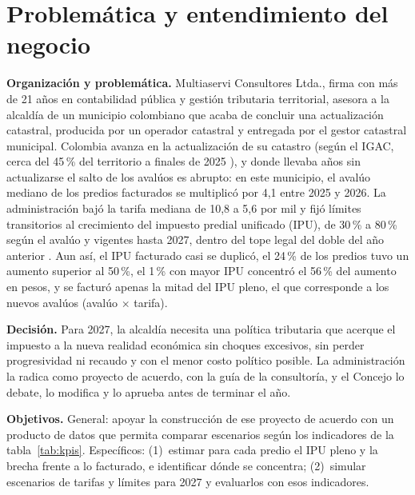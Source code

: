 \documentclass[12pt,letterpaper]{article}
\begin{document}
\encabezado


\section{Problemática y entendimiento del negocio} %
\textbf{Organización y problemática.} Multiaservi Consultores Ltda., firma con más de 21 años
en contabilidad pública y gestión tributaria territorial, asesora a la alcaldía de un municipio
colombiano que acaba de concluir una actualización catastral, producida por un operador catastral
y entregada por el gestor catastral municipal. Colombia avanza en la actualización de su catastro
(según el IGAC, cerca del 45\,\% del territorio a finales de 2025 \cite{portafolio2025igac}), y
donde llevaba años sin actualizarse el salto de los avalúos es abrupto: en este municipio, el
avalúo mediano de los predios facturados se multiplicó por 4,1 entre 2025 y 2026. La
administración bajó la tarifa mediana de 10,8 a 5,6 por mil y fijó límites transitorios al
crecimiento del impuesto predial unificado (IPU), de 30\,\% a 80\,\% según el avalúo y vigentes
hasta 2027, dentro del tope legal del doble del año anterior \cite{ley44}. Aun así, el IPU
facturado casi se duplicó, el 24\,\% de los predios tuvo un aumento superior al 50\,\%, el 1\,\%
con mayor IPU concentró el 56\,\% del aumento en pesos, y se facturó apenas la mitad del IPU
pleno, el que corresponde a los nuevos avalúos (avalúo $\times$ tarifa).

\textbf{Decisión.} Para 2027, la alcaldía necesita una política tributaria que acerque el
impuesto a la nueva realidad económica sin choques excesivos, sin perder progresividad ni recaudo
y con el menor costo político posible. La administración la radica como proyecto de acuerdo, con
la guía de la consultoría, y el Concejo lo debate, lo modifica y lo aprueba antes de terminar el
año.

\textbf{Objetivos.} General: apoyar la construcción de ese proyecto de acuerdo con un producto de
datos que permita comparar escenarios según los indicadores de la tabla~\ref{tab:kpis}.
Específicos: (1)~estimar para cada predio el IPU pleno y la brecha frente a lo facturado, e
identificar dónde se concentra; (2)~simular escenarios de tarifas y límites para 2027 y
evaluarlos con esos indicadores.
\end{document}
